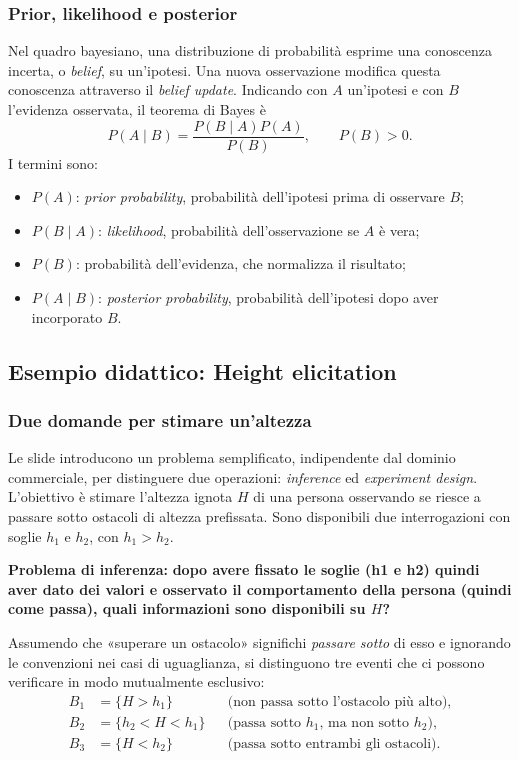 \subsubsection{Prior, likelihood e posterior}
Nel quadro bayesiano, una distribuzione di probabilità esprime una conoscenza incerta, o \emph{belief}, su un'ipotesi. Una nuova osservazione modifica questa conoscenza attraverso il \emph{belief update}. Indicando con $A$ un'ipotesi e con $B$ l'evidenza osservata, il teorema di Bayes è
\[
P(A\mid B)=\frac{P(B\mid A)P(A)}{P(B)},\qquad P(B)>0.
\]
I termini sono:
\begin{itemize}
    \item $P(A)$: \emph{prior probability}, probabilità dell'ipotesi prima di osservare $B$;
    \item $P(B\mid A)$: \emph{likelihood}, probabilità dell'osservazione se $A$ è vera;
    \item $P(B)$: probabilità dell'evidenza, che normalizza il risultato;
    \item $P(A\mid B)$: \emph{posterior probability}, probabilità dell'ipotesi dopo aver incorporato $B$.
\end{itemize}

\subsection{Esempio didattico: Height elicitation}

\subsubsection{Due domande per stimare un'altezza}
Le slide introducono un problema semplificato, indipendente dal dominio commerciale, per distinguere due operazioni: \emph{inference} ed \emph{experiment design}. L'obiettivo è stimare l'altezza ignota $H$ di una persona osservando se riesce a passare sotto ostacoli di altezza prefissata. Sono disponibili due interrogazioni con soglie $h_1$ e $h_2$, con $h_1>h_2$.

\textbf{Problema di inferenza:} \textbf{dopo avere fissato le soglie (h1 e h2) quindi aver dato dei valori e osservato il comportamento della persona (quindi come passa), quali informazioni sono disponibili su $H$?}

Assumendo che «superare un ostacolo» significhi \emph{passare sotto} di esso e ignorando le convenzioni nei casi di uguaglianza, si distinguono tre eventi che ci possono verificare in modo mutualmente esclusivo:
\begin{align*}
B_1&=\{H>h_1\} &&\text{(non passa sotto l'ostacolo più alto)},\\
B_2&=\{h_2<H<h_1\} &&\text{(passa sotto $h_1$, ma non sotto $h_2$)},\\
B_3&=\{H<h_2\} &&\text{(passa sotto entrambi gli ostacoli)}.
\end{align*}

